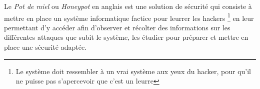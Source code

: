 Le \emph{Pot de miel} ou \emph{Honeypot} en anglais est une solution de 
sécurité qui consiste
à mettre en place un système informatique factice pour leurrer 
les hackers \footnote{Le 
système doit ressembler à un vrai système aux yeux du hacker, 
pour qu'il ne puisse
pas s'apercevoir que c'est un leurre} en leur permettant d'y accéder afin
d'observer et récolter des informations sur
les différentes attaques que subit le système, les étudier pour  préparer
 et mettre en place une sécurité adaptée.

